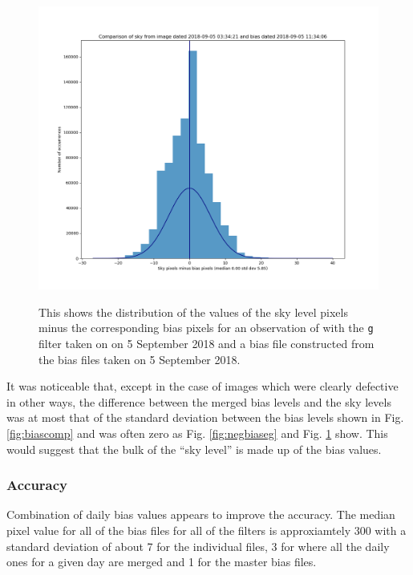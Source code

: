 \begin{figure}[!htbp]
\begin{center}
\includegraphics[scale=0.5]{images/negbiasmerg.png}
\end{center}   
\caption{This shows the distribution of the values of the sky level pixels minus
the corresponding bias pixels for an observation of {\bstar} with the \texttt{g}
filter taken on on 5 September 2018 and a bias file constructed from the bias
files taken on 5 September 2018.} \protect\label{fig:negbiasmerg}
\end{figure}

It was noticeable that, except in the case of images which were clearly
defective in other ways, the difference between the merged bias levels and the
sky levels was at most that of the standard deviation between the bias levels
shown in Fig. \ref{fig:biascomp} and was often zero as Fig.
\ref{fig:negbiaseg} and Fig. \ref{fig:negbiasmerg} show. This would suggest that
the bulk of the ``sky level'' is made up of the bias values.

\subsubsection{Accuracy}
Combination of daily bias values appears to improve the accuracy. The median
pixel value for all of the bias files for all of the filters is approxiamtely
300 with a standard deviation of about 7 for the individual files, 3 for where
all the daily ones for a given day are merged and 1 for the master bias files.

